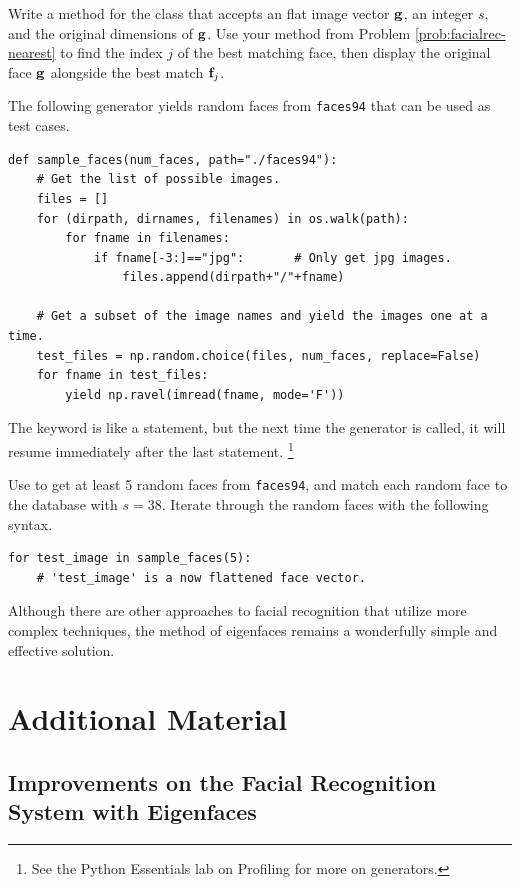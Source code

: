 \begin{problem}
Write a method for the  class that accepts an flat image vector $\mathbf{g}$, an integer $s$, and the original dimensions of $\mathbf{g}$.
Use your method from Problem \ref{prob:facialrec-nearest} to find the index $j$ of the best matching face, then display the original face $\mathbf{g}$ alongside the best match $\mathbf{f}_j$.

The following generator yields random faces from \texttt{faces94} that can be used as test cases.
%
\begin{lstlisting}
def sample_faces(num_faces, path="./faces94"):
    # Get the list of possible images.
    files = []
    for (dirpath, dirnames, filenames) in os.walk(path):
        for fname in filenames:
            if fname[-3:]=="jpg":       # Only get jpg images.
                files.append(dirpath+"/"+fname)

    # Get a subset of the image names and yield the images one at a time.
    test_files = np.random.choice(files, num_faces, replace=False)
    for fname in test_files:
        yield np.ravel(imread(fname, mode='F'))
\end{lstlisting}
%
The  keyword is like a  statement, but the next time the generator is called, it will resume immediately after the last  statement.%
\footnote{See the Python Essentials lab on Profiling for more on generators.}

Use  to get at least 5 random faces from \texttt{faces94}, and match each random face to the database with $s=38$.
Iterate through the random faces with the following syntax.
%
\begin{lstlisting}
for test_image in sample_faces(5):
    # 'test_image' is a now flattened face vector.
\end{lstlisting}
\label{prob:facialrec-match}
\end{problem}

Although there are other approaches to facial recognition that utilize more complex techniques, the method of eigenfaces remains a wonderfully simple and effective solution.

\newpage

\section*{Additional Material} %

\subsection*{Improvements on the Facial Recognition System with Eigenfaces} %

